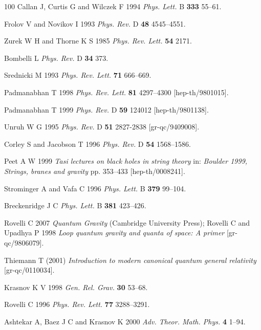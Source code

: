 \documentclass[12pt]{iopart}
\begin{document}
\begin{thebibliography}{100}
Callan J,  Curtis G and  Wilczek F 1994\textit{ Phys. Lett.} B \textbf{333}   55--61.

Frolov V and  Novikov I 1993 \textit{Phys.  Rev.} D \textbf{48}  4545--4551.

Zurek W H and Thorne  K S 1985 \textit{Phys. Rev. Lett.} \textbf{54}  2171.

Bombelli L  \textit{Phys. Rev.} D \textbf{34}  373.

Srednicki M 1993 \textit{Phys. Rev. Lett.} \textbf{71}  666--669.

Padmanabhan T 1998 \textit{Phys.  Rev. Lett.} \textbf{81}  4297--4300 [hep-th/9801015].

Padmanabhan T  1999 \textit{Phys. Rev.} D \textbf{59}  124012 [hep-th/9801138].

Unruh W G 1995 \textit{Phys. Rev.} D \textbf{51} 2827-2838  [gr-qc/9409008].

Corley S and  Jacobson T 1996 \textit{Phys.  Rev.} D \textbf{54}  1568--1586.


Peet A W 1999 \textit{Tasi lectures on black holes in string theory} in: \textit{Boulder 1999,  Strings, branes and gravity}  pp. 353--433 [hep-th/0008241].

Strominger A and  Vafa C  1996 \textit{Phys. Lett.} B \textbf{379} 99--104.

Breckenridge J C  \textit{Phys. Lett.} B \textbf{381}  423--426.


Rovelli  C 2007 \textit{Quantum Gravity} (Cambridge University Press);
Rovelli  C and Upadhya P  1998 \textit{Loop quantum gravity and quanta of space: A primer}
  [gr-qc/9806079].

Thiemann T  (2001) \textit{Introduction to modern canonical quantum general relativity} [gr-qc/0110034].

Krasnov K V 1998  \textit{Gen. Rel.  Grav.} \textbf{30}  53--68.

Rovelli C   1996 \textit{Phys. Rev. Lett.} \textbf{77} 3288--3291.

Ashtekar A, Baez J C and Krasnov K 2000 \textit{ Adv. Theor. Math. Phys.} \textbf{4}  1--94.


\end{thebibliography}
\end{document}
